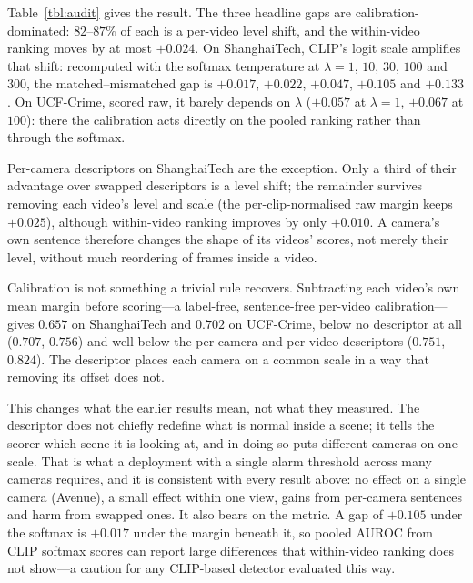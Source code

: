 \documentclass[a4paper,fleqn]{cas-sc}
\begin{document}
Table~\ref{tbl:audit} gives the result. The three headline gaps are
calibration-dominated: $82$--$87\%$ of each is a per-video level shift, and the
within-video ranking moves by at most $+0.024$. On ShanghaiTech, CLIP's logit
scale amplifies that shift: recomputed with the softmax temperature at
$\lambda{=}1$, $10$, $30$, $100$ and $300$, the matched--mismatched gap is
$+0.017$, $+0.022$, $+0.047$, $+0.105$ and $+0.133$. On UCF-Crime, scored raw,
it barely depends on $\lambda$ ($+0.057$ at $\lambda{=}1$, $+0.067$ at $100$):
there the calibration acts directly on the pooled ranking rather than through
the softmax.

Per-camera descriptors on ShanghaiTech are the exception. Only a third of their
advantage over swapped descriptors is a level shift; the remainder survives
removing each video's level and scale (the per-clip-normalised raw margin keeps
$+0.025$), although within-video ranking improves by only $+0.010$. A camera's
own sentence therefore changes the shape of its videos' scores, not merely their
level, without much reordering of frames inside a video.

Calibration is not something a trivial rule recovers. Subtracting each video's
own mean margin before scoring---a label-free, sentence-free per-video
calibration---gives $0.657$ on ShanghaiTech and $0.702$ on UCF-Crime, below no
descriptor at all ($0.707$, $0.756$) and well below the per-camera and
per-video descriptors ($0.751$, $0.824$). The descriptor places each camera on a
common scale in a way that removing its offset does not.

This changes what the earlier results mean, not what they measured. The
descriptor does not chiefly redefine what is normal inside a scene; it tells the
scorer which scene it is looking at, and in doing so puts different cameras on
one scale. That is what a deployment with a single alarm threshold across many
cameras requires, and it is consistent with every result above: no effect on a
single camera (Avenue), a small effect within one view, gains from per-camera
sentences and harm from swapped ones. It also bears on the metric. A gap of
$+0.105$ under the softmax is $+0.017$ under the margin beneath it, so pooled
AUROC from CLIP softmax scores can report large differences that within-video
ranking does not show---a caution for any CLIP-based detector evaluated this way.
\end{document}
